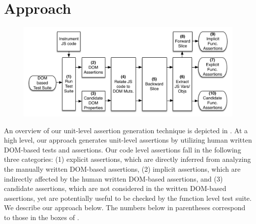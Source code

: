 \section{Approach} \label{Sec:approach}
\begin{figure}[!t]
  \centering
  \includegraphics[width=1\hsize]{fig/approachDiagram}
  \vspace{-0.3in} 
  \label{Fig:approachDiagram}
  \vspace{-0.1in} 
\end{figure}

An overview of our unit-level assertion generation technique is depicted in .
At a high level, our approach generates unit-level assertions by utilizing human written DOM-based tests and assertions. Our code level assertions fall in the following three categories: (1) explicit assertions, which are directly inferred from analyzing the manually written DOM-based assertions, (2) implicit assertions, which are indirectly affected by the human written DOM-based assertions, and (3) candidate assertions, which are not considered in the written DOM-based assertions, yet are potentially useful to be checked by the function level test suite. We describe our approach below. The numbers below in parentheses correspond to those in the boxes of .

